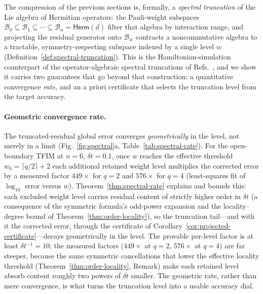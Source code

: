 \documentclass[aps,prxquantum,reprint,superscriptaddress,nofootinbib,amsmath,amssymb]{revtex4-2}
\newcommand{\tfim}{TFIM}
\newcommand{\cB}{\mathcal{B}}
\newcommand{\dt}{\delta t}
\begin{document}
The compression of the previous sections is, formally, a \emph{spectral truncation} of the Lie algebra of Hermitian operators: the Pauli-weight subspaces $\cB_0\subseteq\cB_1\subseteq\cdots\subseteq\cB_n=\mathsf{Herm}(d)$ filter that algebra by interaction range, and projecting the residual generator onto $\cB_w$ contracts a noncommutative algebra to a tractable, symmetry-respecting subspace indexed by a single level $w$ (Definition~\ref{def:spectral-truncation}). This is the Hamiltonian-simulation counterpart of the operator-algebraic spectral truncations of Refs.~\cite{hashimoto2024spectral,hashimoto2023rkhm}, and we show it carries two guarantees that go beyond that construction: a quantitative convergence \emph{rate}, and an a priori certificate that selects the truncation level from the target accuracy.

\paragraph{Geometric convergence rate.} The truncated-residual global error converges \emph{geometrically} in the level, not merely in a limit (Fig.~\ref{fig:spectral}a, Table~\ref{tab:spectral-rate}). For the open-boundary \tfim{} at $n=6$, $\dt=0.1$, once $w$ reaches the effective threshold $w_0=\lceil q/2\rceil+2$ each additional retained weight level multiplies the corrected error by a measured factor $449\times$ for $q=2$ and $576\times$ for $q=4$ (least-squares fit of $\log_{10}$ error versus $w$). Theorem~\ref{thm:spectral-rate} explains and bounds this: each excluded weight level carries residual content of strictly higher order in $\dt$ (a consequence of the symmetric formula's odd-power expansion and the locality--degree bound of Theorem~\ref{thm:order-locality}), so the truncation tail---and with it the corrected error, through the certificate of Corollary~\ref{cor:projected-certificate}---decays geometrically in the level. The provable per-level factor is at least $\dt^{-1}=10$; the measured factors ($449\times$ at $q=2$, $576\times$ at $q=4$) are far steeper, because the same symmetric cancellations that lower the effective locality threshold (Theorem~\ref{thm:order-locality}, Remark) make each retained level absorb content roughly two powers of $\dt$ smaller. The geometric rate, rather than mere convergence, is what turns the truncation level into a usable accuracy dial.
\end{document}
